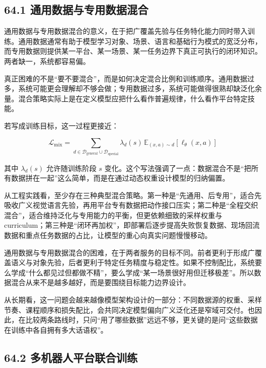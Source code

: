 \subsection*{64.1 通用数据与专用数据混合}


通用数据与专用数据混合的意义，在于把广覆盖先验与任务特化能力同时带入训练。通用数据通常有助于模型学习对象、场景、语言和基础行为模式的宽泛分布，而专用数据则提供某一平台、某一场景、某一任务边界下真正可执行的闭环知识。两者缺一，系统都容易偏。

真正困难的不是“要不要混合”，而是如何决定混合比例和训练顺序。通用数据过多，系统可能更会理解却不够会做；专用数据过多，系统可能做得很熟却缺泛化余量。混合策略实际上是在定义模型应把什么看作普遍规律，什么看作平台特定技能。

若写成训练目标，这一过程更接近：

\begingroup
\scriptsize
\begin{equation*}
\mathcal{L}_{\text{mix}} = \sum_{d \in \mathcal{D}_{\text{general}} \cup \mathcal{D}_{\text{special}}} \lambda_d(s)\,\mathbb{E}_{(x,a)\sim d}[\ell_\theta(x,a)]
\end{equation*}
\endgroup

其中 \(\lambda_d(s)\) 允许随训练阶段 \(s\) 变化。这个写法强调了一点：数据混合不是“把所有数据拼在一起”这么简单，而是在通过动态权重设计模型的归纳偏置。

从工程实践看，至少存在三种典型混合策略。第一种是“先通用、后专用”，适合先吸收广义视觉语言先验，再用平台专有数据把动作接口压实；第二种是“全程交织混合”，适合维持泛化与专用能力的平衡，但更依赖细致的采样权重与 curriculum；第三种是“闭环再加权”，即部署后逐步提高失败恢复数据、现场回流数据和重点任务数据的占比，让模型的重心向真实问题慢慢移动。

通用数据与专用数据混合的困难，在于两者服务的目标不同。前者更利于形成广覆盖语义与对象先验，后者更利于特定任务精度与稳定性。如果不控制配比，系统要么学成“什么都见过但都做不精”，要么学成“某一场景很好用但迁移极差”。所以数据混合从来不是越多越好，而是要围绕目标能力边界设计。

从长期看，这一问题会越来越像模型架构设计的一部分：不同数据源的权重、采样节奏、课程顺序和损失配比，会共同决定模型偏向广义泛化还是窄域可交付。也因此，在比较两条路线时，只问“用了哪些数据”远远不够，更关键的是问“这些数据在训练中各自拥有多大话语权”。

\subsection*{64.2 多机器人平台联合训练}


